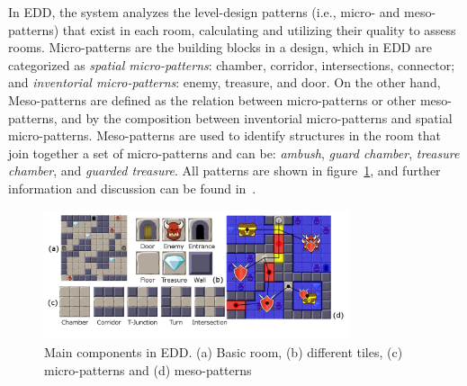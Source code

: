 In EDD, the system analyzes the level-design patterns (i.e., micro- and meso-patterns) that exist in each room, calculating and utilizing their quality to assess rooms. Micro-patterns are the building blocks in a design, which in EDD are categorized as \textit{spatial micro-patterns}: chamber, corridor, intersections, connector; and \textit{inventorial micro-patterns}: enemy, treasure, and door. On the other hand, Meso-patterns are defined as the relation between micro-patterns or other meso-patterns, and by the composition between inventorial micro-patterns and spatial micro-patterns. Meso-patterns are used to identify structures in the room that join together a set of micro-patterns and can be: \textit{ambush}, \textit{guard chamber}, \textit{treasure chamber}, and \textit{guarded treasure}. All patterns are shown in figure~\ref{fig:basecomponents}, and further information and discussion can be found in~.

\begin{figure}[b]
\centerline{\includegraphics[width=9cm]{figures/figure1.png}}
\caption{Main components in EDD. (a) Basic room, (b) different tiles, (c) micro-patterns and (d) meso-patterns}
\label{fig:basecomponents}
\end{figure}




